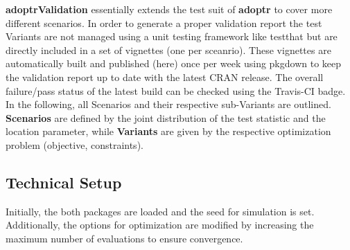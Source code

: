 \documentclass[]{book}
\newenvironment{Shaded}{\begin{snugshade}}{\end{snugshade}}
\newcommand{\CharTok}[1]{\textcolor[rgb]{0.31,0.60,0.02}{#1}}
\newcommand{\CommentTok}[1]{\textcolor[rgb]{0.56,0.35,0.01}{\textit{#1}}}
\newcommand{\ControlFlowTok}[1]{\textcolor[rgb]{0.13,0.29,0.53}{\textbf{#1}}}
\newcommand{\DataTypeTok}[1]{\textcolor[rgb]{0.13,0.29,0.53}{#1}}
\newcommand{\DecValTok}[1]{\textcolor[rgb]{0.00,0.00,0.81}{#1}}
\newcommand{\FloatTok}[1]{\textcolor[rgb]{0.00,0.00,0.81}{#1}}
\newcommand{\KeywordTok}[1]{\textcolor[rgb]{0.13,0.29,0.53}{\textbf{#1}}}
\newcommand{\NormalTok}[1]{#1}
\newcommand{\StringTok}[1]{\textcolor[rgb]{0.31,0.60,0.02}{#1}}
\begin{document}
\textbf{adoptrValidation} essentially extends the test suit of \textbf{adoptr} to cover
more different scenarios.
In order to generate a proper validation report the test Variants are not managed
using a unit testing framework like testthat but are directly included in a
set of vignettes (one per sceanrio).
These vignettes are automatically built and published (here) once per week
using pkgdown to keep the validation report up to date with the latest
CRAN release.
The overall failure/pass status of the latest build can be checked using the
Travis-CI badge.
In the following, all Scenarios and their respective sub-Variants are outlined.
\textbf{Scenarios} are defined by the joint distribution of the test statistic and the
location parameter, while \textbf{Variants} are given by the respective optimization
problem (objective, constraints).

\hypertarget{technical-setup}{%
\subsection{Technical Setup}\label{technical-setup}}

Initially, the both packages are loaded and the seed for simulation is set.
Additionally, the options for optimization are modified by increasing
the maximum number of evaluations to ensure convergence.

\begin{Shaded}
\end{Shaded}
\end{document}
